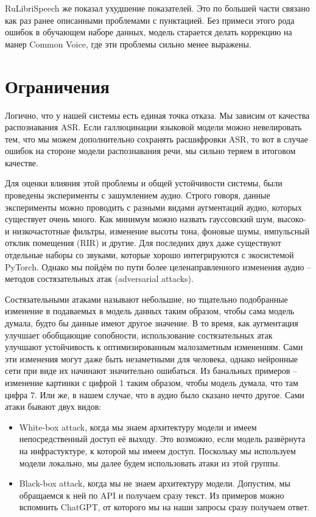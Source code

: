 RuLibriSpeech же показал ухудшение показателей.
Это по большей части связано как раз ранее описанными проблемами с пунктацией.
Без примеси этого рода ошибок в обучающем наборе данных, модель старается делать коррекцию на манер Common Voice, где эти проблемы сильно менее выражены.

\section{Ограничения}

Логично, что у нашей системы есть единая точка отказа.
Мы зависим от качества распознавания ASR.
Если галлюцинации языковой модели можно невелировать тем, что мы можем дополнительно сохранять расшифровки ASR, то вот в случае ошибок на стороне модели распознавания речи, мы сильно теряем в итоговом качестве.

Для оценки влияния этой проблемы и общей устойчивости системы, были проведены эксперименты с зашумлением аудио.
Строго говоря, данные эксперименты можно проводить с разными видами аугментаций аудио, которых существует очень много.
Как минимум можно назвать гауссовский шум, высоко- и низкочастотные фильтры, изменение высоты тона, фоновые шумы, импульсный отклик помещения (RIR) и другие.
Для последних двух даже существуют отдельные наборы со звуками, которые хорошо интегрируются с экосистемой PyTorch.
Однако мы пойдём по пути более целенаправленного изменения аудио -- методов состязательных атак (adversarial attacks)\cite{olivier2022recent,zhang2022adversarial,carlini2018audio}.

Состязательными атаками называют небольшие, но тщательно подобранные изменение в подаваемых в модель данных таким образом, чтобы сама модель думала, будто бы данные имеют другое значение.
В то время, как аугментация улучшает обобщающие сопобности, использование состязательных атак улучшают устойчивость к оптимизированным малозаметным изменениям.
Сами эти изменения могут даже быть незаметными для человека, однако нейронные сети при виде их начинают значительно ошибаться.
Из банальных примеров -- изменение картинки с цифрой 1 таким образом, чтобы модель думала, что там цифра 7\cite{warr2019strengthening}.
Или же, в нашем случае, что в аудио было сказано нечто другое.
Сами атаки бывают двух видов:

\begin{itemize}
  \item White-box attack, когда мы знаем архитектуру модели и имеем непосредственный доступ её выходу.
  Это возможно, если модель развёрнута на инфрастуктуре, к которой мы имеем доступ.
  Поскольку мы используем модели локально, мы далее будем использовать атаки из этой группы.
  \item Black-box attack, когда мы не знаем архитектуру модели.
  Допустим, мы обращаемся к ней по API и получаем сразу текст.
  Из примеров можно вспомнить ChatGPT, от которого мы на наши запросы сразу получаем ответ.
\end{itemize}

